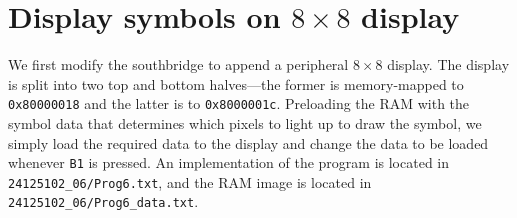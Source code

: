 \documentclass{exam}
\begin{document}
\section{Display symbols on $8 \times 8$ display}
We first modify the southbridge to append a peripheral $8 \times 8$ display. The display is split into two top and bottom halves---the former is memory-mapped to \verb|0x80000018| and the latter is to \verb|0x8000001c|. Preloading the RAM with the symbol data that determines which pixels to light up to draw the symbol, we simply load the required data to the display and change the data to be loaded whenever \verb|B1| is pressed. An implementation of the program is located in \verb|24125102_06/Prog6.txt|, and the RAM image is located in \verb|24125102_06/Prog6_data.txt|.
\end{document}
